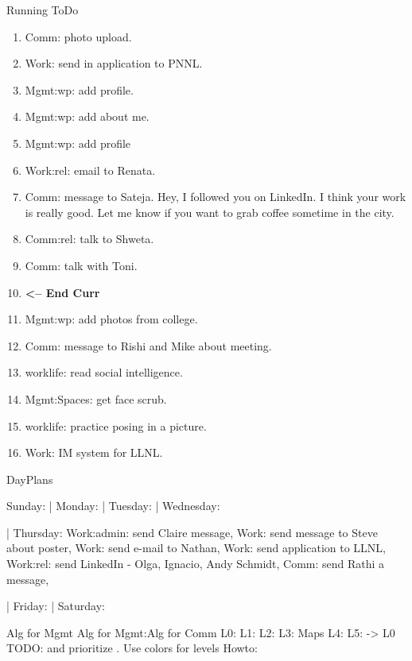 \begin{columns}
\begin{column}{0.6\linewidth}
\begin{block}{Running ToDo}
\begin{enumerate}
      \item \tiny Comm: photo upload. 
                
        \item \tiny Work: send in application to PNNL.
          
        \item \tiny Mgmt:wp: add profile.
        \item \tiny Mgmt:wp: add about me. 
          
        \item \tiny Mgmt:wp: add profile 
        \item \tiny Work:rel: email to Renata.  
        \item \tiny Comm: message to Sateja. 
          Hey, I followed you on LinkedIn. I think your work is really good. 
          Let me know if you want to grab coffee sometime in the city. 
        \item \tiny Comm:rel: talk to Shweta.
        \item \tiny Comm: talk with Toni. 
          
\item \tiny \textbf{ <-- End Curr }
      \item \tiny Mgmt:wp: add photos from college. 
      \item \tiny Comm: message to Rishi and Mike about meeting. 
      \item \tiny worklife: read social intelligence.  
      \item \tiny Mgmt:Spaces: get face scrub. 
      \item \tiny worklife: practice posing in a picture.  
      \item \tiny Work: IM system for LLNL.  
      \end{enumerate}
    \end{block} 

\begin{block}{DayPlans} 

  Sunday:   
  | Monday:  
  | Tuesday:  
  | Wednesday: 

  | Thursday: Work:admin: send Claire message,
  Work: send message to Steve about poster,  
  Work: send e-mail to Nathan, 
  Work: send application to LLNL, 
  Work:rel: send LinkedIn - Olga, Ignacio, Andy Schmidt, 
  Comm: send Rathi a message, 

| Friday: 
| Saturday:  
\end{block}

\begin{block}{Alg for Mgmt}
Alg for Mgmt:Alg for Comm   L0:  L1:  L2:  L3:  Maps L4: L5: -> L0
TODO:  and prioritize . Use colors for levels Howto:  
\end{block} 


\end{column}
\end{columns}
